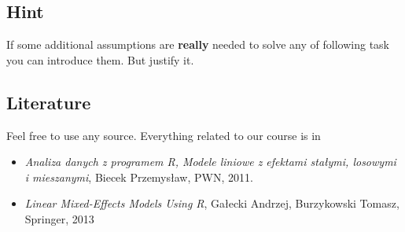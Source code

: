 \documentclass[a4paper,11pt,twoside,openany]{article}
\begin{document}
\subsection*{Hint}

If some additional assumptions are \textbf{really} needed to solve any of following task you can introduce them. But justify it.

\subsection*{Literature}

Feel free to use any source. Everything related to our course is in

\begin{itemize}
\item \textit{Analiza danych z programem R, Modele liniowe z efektami stałymi, losowymi i mieszanymi}, Biecek Przemysław, PWN, 2011.
\item \textit{Linear Mixed-Effects Models Using R}, Gałecki Andrzej, Burzykowski Tomasz, Springer, 2013
\end{itemize}
\end{document}
